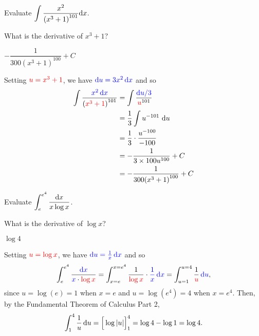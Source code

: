 \begin{Mquestion}[M121 2014A]
Evaluate $\displaystyle \int  \frac{x^2}{{(x^3+1)}^{101}}\mathrm{d}x$.
\end{Mquestion}

\begin{hint}
What is the derivative of $x^3+1$?
\end{hint}

\begin{answer}
$-\dfrac{1}{300{(x^3+1)}^{100}} + C$
\end{answer}

\begin{solution}
Setting $\textcolor{red}{u=x^3+1}$, we have $\textcolor{blue}{\mathrm{d}u = 3x^2\,\mathrm{d}x}$ and so
\begin{align*}
 \int  \frac{\textcolor{blue}{x^2\,\mathrm{d}x}}{{(\textcolor{red}{x^3+1})}^{101}}
  &= \int \frac{\textcolor{blue}{\mathrm{d}u/3}}{\textcolor{red}{u}^{101}}\\
  &=\frac{1}{3}\int u^{-101}\ \mathrm{d}u\\
&=\frac{1}{3}\cdot\dfrac{u^{-100}}{-100}\\
  &= -\frac{1}{3\times 100 u^{100}} + C\\
  &=-\frac{1}{300{(x^3+1)}^{100}} + C
\end{align*}
\end{solution}



\begin{Mquestion}[2016Q2]
Evaluate $\displaystyle \int_{e}^{e^4} \frac{\mathrm{d}x}{x\log x}$.
\end{Mquestion}

\begin{hint}
What is the derivative of $\log x$?
\end{hint}

\begin{answer}
$\log 4$
\end{answer}

\begin{solution}
Setting $\textcolor{red}{u=\log x}$, we have $\textcolor{blue}{\mathrm{d}u = \frac{1}{x}\,\mathrm{d}x}$ and so
\begin{equation*}
 \int_{e}^{e^4} \frac{\textcolor{blue}{\mathrm{d}x}}{\textcolor{blue}x\cdot\textcolor{red}{\log x}}
  = \int_{x=e}^{x=e^4} \frac1{\textcolor{red}{\log x}} \cdot \textcolor{blue}{\frac{1}{x}\,\mathrm{d}x }
  = \int_{u=1}^{u=4} \frac{1}{\textcolor{red}u}\,\textcolor{blue}{ \mathrm{d}u},
\end{equation*}
since $u=\log(e)=1$ when $x=e$ and $u=\log(e^4)=4$ when $x=e^4$.
Then, by the Fundamental Theorem of Calculus Part 2,
\begin{equation*}
\int_{1}^{4} \frac{1}{u}\, \mathrm{d}u
   = \Big[\log |u| \Big]_{1}^{4} = \log 4 - \log 1 = \log 4.
\end{equation*}
\end{solution}


